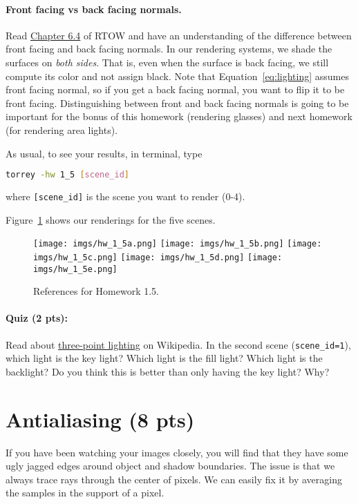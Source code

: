 \paragraph{Front facing vs back facing normals.} Read \href{https://raytracing.github.io/books/RayTracingInOneWeekend.html#surfacenormalsandmultipleobjects/frontfacesversusbackfaces}{Chapter 6.4} of RTOW and have an understanding of the difference between front facing and back facing normals. In our rendering systems, we shade the surfaces on \emph{both sides}. That is, even when the surface is back facing, we still compute its color and not assign black. Note that Equation~\eqref{eq:lighting} assumes front facing normal, so if you get a back facing normal, you want to flip it to be front facing. Distinguishing between front and back facing normals is going to be important for the bonus of this homework (rendering glasses) and next homework (for rendering area lights).

As usual, to see your results, in terminal, type
\begin{lstlisting}[language=bash]
  torrey -hw 1_5 [scene_id]
\end{lstlisting}
where \lstinline{[scene_id]} is the scene you want to render (0-4).

Figure~\ref{fig:hw_1_5} shows our renderings for the five scenes.

\begin{figure}[ht]
    \centering
    \texttt{[image: imgs/hw\_1\_5a.png]}
    \texttt{[image: imgs/hw\_1\_5b.png]}
    \texttt{[image: imgs/hw\_1\_5c.png]}
    \texttt{[image: imgs/hw\_1\_5d.png]}
    \texttt{[image: imgs/hw\_1\_5e.png]}
    \caption{References for Homework 1.5.}
    \label{fig:hw_1_5}
\end{figure}

\paragraph{Quiz (2 pts):} Read about \href{https://en.wikipedia.org/wiki/Three-point_lighting}{three-point lighting} on Wikipedia. In the second scene (\lstinline{scene_id=1}), which light is the key light? Which light is the fill light? Which light is the backlight? Do you think this is better than only having the key light? Why?

\section{Antialiasing (8 pts)}
If you have been watching your images closely, you will find that they have some ugly jagged edges around object and shadow boundaries. The issue is that we always trace rays through the center of pixels. We can easily fix it by averaging the samples in the support of a pixel.

